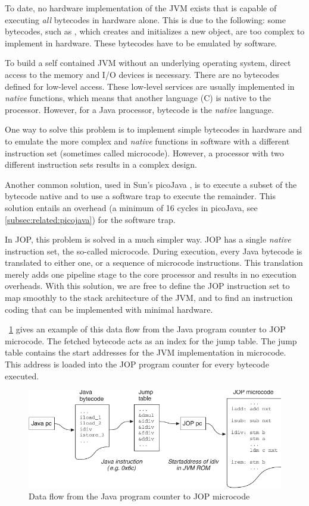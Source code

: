To date, no hardware implementation of the JVM exists that is
capable of executing \emph{all} bytecodes in hardware alone. This is
due to the following: some bytecodes, such as , which
creates and initializes a new object, are too complex to implement
in hardware. These bytecodes have to be emulated by software.

To build a self contained JVM without an underlying operating
system, direct access to the memory and I/O devices is necessary.
There are no bytecodes defined for low-level access. These low-level
services are usually implemented in \emph{native} functions, which
means that another language (C) is native to the processor. However,
for a Java processor, bytecode is the \emph{native} language.

One way to solve this problem is to implement simple bytecodes in
hardware and to emulate the more complex and \emph{native} functions
in software with a different instruction set (sometimes called
microcode). However, a processor with two different instruction sets
results in a complex design.

Another common solution, used in Sun's picoJava \cite{pjMicroArch},
is to execute a subset of the bytecode native and to use a software
trap to execute the remainder. This solution entails an overhead (a
minimum of 16 cycles in picoJava, see \ref{subsec:related:picojava})
for the software trap.

In JOP, this problem is solved in a much simpler way. JOP has a
single \emph{native} instruction set, the so-called microcode.
During execution, every Java bytecode is translated to either one,
or a sequence of microcode instructions. This translation merely
adds one pipeline stage to the core processor and results in no
execution overheads. With this solution, we are free to define the
JOP instruction set to map smoothly to the stack architecture of the
JVM, and to find an instruction coding that can be implemented with
minimal hardware.

\figurename~\ref{fig_arch_data_flow} gives an example of this data
flow from the Java program counter to JOP microcode. The fetched
bytecode acts as an index for the jump table. The jump table
contains the start addresses for the JVM implementation in
microcode. This address is loaded into the JOP program counter for
every bytecode executed.


\begin{figure}
    \centering
    \includegraphics[scale=\picscale]{arch/arch_indirection}
    \caption{Data flow from the Java program counter to JOP microcode}
    \label{fig_arch_data_flow}
\end{figure}

